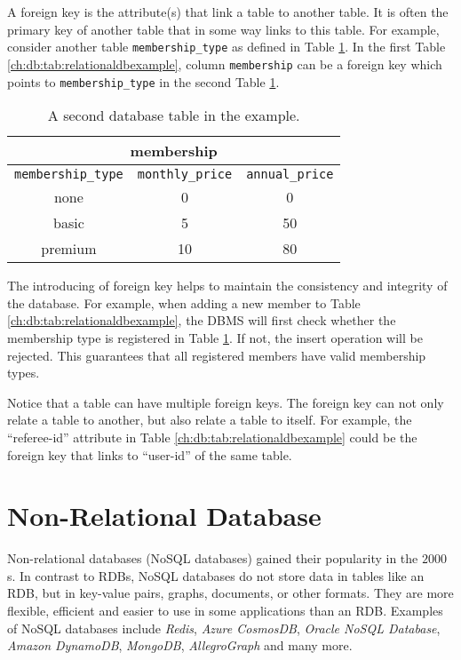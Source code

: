 A foreign key is the attribute(s) that link a table to another table. It is often the primary key of another table that in some way links to this table. For example, consider another table \verb|membership_type| as defined in Table \ref{ch:db:tab:relationaldbexampleanother}. In the first Table \ref{ch:db:tab:relationaldbexample}, column \verb|membership| can be a foreign key which points to \verb|membership_type| in the second Table \ref{ch:db:tab:relationaldbexampleanother}.

\begin{table}
	\centering \caption{A second database table in the example.} \label{ch:db:tab:relationaldbexampleanother}
	\begin{tabular}{|c|c|c|}
		\hline
		\multicolumn{3}{|c|}{membership} \\ \hline
		\verb|membership_type| & \verb|monthly_price| & \verb|annual_price| \\ \hline
		none & 0 & 0 \\ \hline
		basic & 5 & 50 \\ \hline
		premium & 10 & 80 \\ \hline
	\end{tabular}
\end{table}

The introducing of foreign key helps to maintain the consistency and integrity of the database. For example, when adding a new member to Table \ref{ch:db:tab:relationaldbexample}, the DBMS will first check whether the membership type is registered in Table \ref{ch:db:tab:relationaldbexampleanother}. If not, the insert operation will be rejected. This guarantees that all registered members have valid membership types.

Notice that a table can have multiple foreign keys. The foreign key can not only relate a table to another, but also relate a table to itself. For example, the ``referee-id'' attribute in Table \ref{ch:db:tab:relationaldbexample} could be the foreign key that links to ``user-id'' of the same table.

\section{Non-Relational Database}

Non-relational databases (NoSQL databases) gained their popularity in the $2000$s. In contrast to RDBs, NoSQL databases do not store data in tables like an RDB, but in key-value pairs, graphs, documents, or other formats. They are more flexible, efficient and easier to use in some applications than an RDB. Examples of NoSQL databases include \textit{Redis}, \textit{Azure CosmosDB}, \textit{Oracle NoSQL Database}, \textit{Amazon DynamoDB}, \textit{MongoDB}, \textit{AllegroGraph} and many more.

